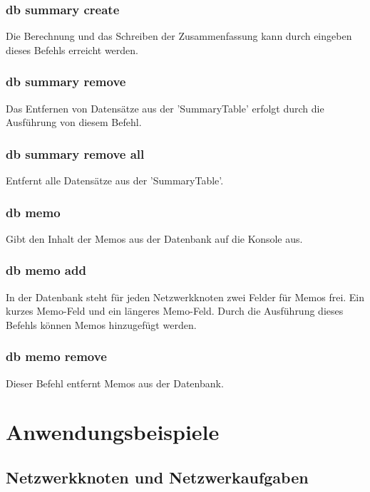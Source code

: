 \documentclass[12pt,a4paper]{report}
\begin{document}
\subsubsection{db summary create}

Die Berechnung und das Schreiben der Zusammenfassung kann durch eingeben dieses Befehls erreicht werden.

\subsubsection{db summary remove}

Das Entfernen von Datensätze aus der 'SummaryTable' erfolgt durch die Ausführung von diesem Befehl.

\subsubsection{db summary remove all}

Entfernt alle Datensätze aus der 'SummaryTable'.

\subsubsection{db memo}

Gibt den Inhalt der Memos aus der Datenbank auf die Konsole aus.

\subsubsection{db memo add}

In der Datenbank steht für jeden Netzwerkknoten zwei Felder für Memos frei. Ein kurzes Memo-Feld und ein längeres Memo-Feld. Durch die Ausführung dieses Befehls können Memos hinzugefügt werden.

\subsubsection{db memo remove}

Dieser Befehl entfernt Memos aus der Datenbank.

\section{Anwendungsbeispiele}

\subsection{Netzwerkknoten und Netzwerkaufgaben}
\end{document}
